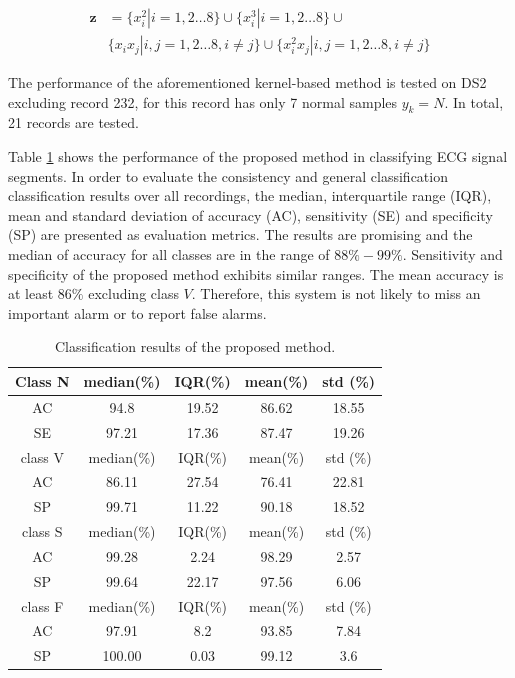 \begin{align}
\label{eq:8-32}
\mathbf{z}&=\{x_i^2|i=1,2\dots 8\}\cup\{x_i^3|i=1,2\dots 8\} \cup\\
\nonumber
& \{x_ix_j|i,j=1,2\dots 8,i\neq j\} \cup  \{  x_i^2x_j | i,j=1,2\dots 8,i\neq j \}
\end{align}

The performance of the aforementioned kernel-based method is tested on DS2 excluding record 232, for this record has only 7 normal samples $y_k=N$. In total, 21 records are tested.

Table \ref{table:result1} shows the performance of the proposed method in classifying ECG signal segments. In order to evaluate the consistency and general classification classification results over all recordings, the median, interquartile range (IQR), mean and standard deviation of accuracy (AC), sensitivity (SE) and specificity (SP) are presented as evaluation metrics. The results are promising and the median of accuracy for all classes are in the range of $88\%-99\%$. Sensitivity and specificity of the proposed method exhibits similar ranges. The mean accuracy is at least $86\%$ excluding class $V$. Therefore, this system is not likely to miss an important alarm or to report false alarms. 

\begin{table}[t]
	\caption{Classification results of the proposed method.}
	\centering
	\begin{tabular}{|c|c|c|c|c|}
		\hline
		Class N & median(\%) & IQR(\%) & mean(\%)& std (\%) \\ 
		\hline 
		AC & 94.8& 19.52 & 86.62 & 18.55\\ 
		\hline 
		SE & 97.21  & 17.36 & 87.47 &19.26 \\ 
		\hline 
		class V & median(\%) & IQR(\%) & mean(\%)& std (\%) \\ 
		\hline 
		AC & 86.11 & 27.54 & 76.41 & 22.81 \\ 
		\hline 
		SP & 99.71 & 11.22 & 90.18 & 18.52 \\ 
		\hline 
		class S & median(\%) & IQR(\%) & mean(\%)& std (\%)\\ 
		\hline 
		AC & 99.28 & 2.24& 98.29&2.57 \\ 
		\hline 
		SP & 99.64& 22.17& 97.56 & 6.06\\ 
		\hline 
		class F & median(\%) & IQR(\%) & mean(\%)& std (\%) \\ 
		\hline 
		AC & 97.91 & 8.2&93.85&7.84\\ 
		\hline 
		SP & 100.00 & 0.03&99.12&3.6\\ 
		\hline 
	\end{tabular} 
	\label{table:result1}
\end{table}

